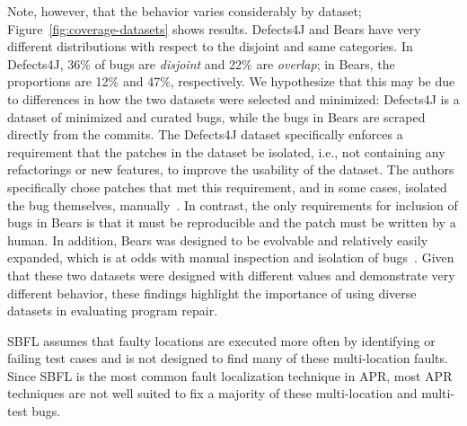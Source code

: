 Note, however, that the behavior varies considerably by dataset;
Figure~\ref{fig:coverage-datasets} shows results.  Defects4J and 
Bears have very different distributions with respect to the 
disjoint and same categories. In Defects4J, 36\% of bugs are \emph{disjoint} and 
22\% are \emph{overlap}; in Bears, the proportions are 12\% and 47\%, respectively.
We hypothesize that this may be due to differences in how the two  
datasets were selected and minimized: Defects4J is a dataset of minimized and curated 
bugs, while the bugs in Bears are scraped directly from the
commits. The Defects4J dataset specifically enforces a requirement that the patches in the 
dataset be isolated, i.e., not containing any refactorings or new features, to improve the 
usability of the dataset. The authors specifically chose patches that met this requirement, 
and in some cases, isolated the bug themselves, manually~\cite{defects4j}. In contrast, the 
only requirements for inclusion of bugs in Bears is that it must be reproducible and 
the patch must be written by a human. In addition, Bears was designed to be evolvable 
and relatively easily expanded, which is at odds with manual inspection and isolation of 
bugs~\cite{bears}.
Given that these two datasets were designed with different values and demonstrate very 
different behavior, these findings highlight the importance of using diverse datasets in 
evaluating program repair.

SBFL assumes that faulty locations are executed more often by identifying 
or failing test cases and is not designed to find many of these multi-location faults. Since 
SBFL 
is the most common fault localization technique in APR, most APR techniques 
are not well suited to fix a majority of these multi-location and multi-test 
bugs.


